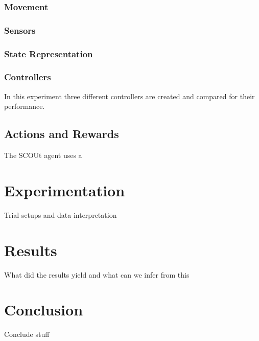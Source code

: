 \documentclass[]{report}
\begin{document}
\subsection{Movement}

\subsection{Sensors}

\subsection{State Representation}

\subsection{Controllers}
In this experiment three different controllers are created and compared for their performance.


\section{Actions and Rewards}
The SCOUt agent uses a



\chapter{Experimentation}
Trial setups and data interpretation



\chapter{Results}
What did the results yield and what can we infer from this



\chapter{Conclusion}
Conclude stuff




\end{document}
